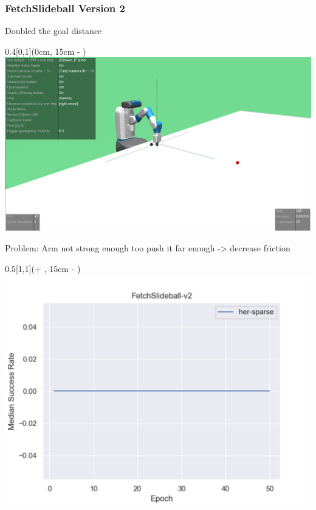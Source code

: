 






\begin{frame}
	\frametitle{FetchSlideball Version 2}	
	\vspace{1cm}
	Doubled the goal distance
	
	
    \begin{textblock*}{0.4\paperwidth}[0,1](0cm, 15cm - \PraesentationSeitenrand)%
        \includegraphics[width=0.4\paperwidth]{./Ressourcen/Figures/FetchSlideball-v2.pdf}
        
        Problem: Arm not strong enough too push it far enough -> decrease friction
    \end{textblock*}
    
    
    \begin{textblock*}{0.5\paperwidth}[1,1](\textwidth + \PraesentationSeitenrand, 15cm - \PraesentationSeitenrand)%
    	\includegraphics[width=0.5\paperwidth]{./Ressourcen/Figures/fig_FetchSlideball-v2.pdf}
    \end{textblock*}
	
	
	
	
\end{frame}
\clearpage

